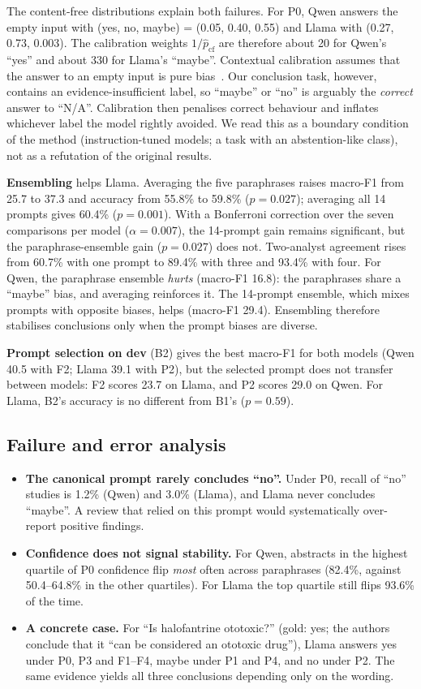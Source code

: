 The content-free distributions explain both failures. For P0, Qwen answers the empty input with (yes, no, maybe) = (0.05, 0.40, 0.55) and Llama with (0.27, 0.73, 0.003). The calibration weights $1/\hat{p}_{\text{cf}}$ are therefore about 20 for Qwen's ``yes'' and about 330 for Llama's ``maybe''. Contextual calibration assumes that the answer to an empty input is pure bias~\cite{zhao2021calibrate}. Our conclusion task, however, contains an evidence-insufficient label, so ``maybe'' or ``no'' is arguably the \emph{correct} answer to ``N/A''. Calibration then penalises correct behaviour and inflates whichever label the model rightly avoided. We read this as a boundary condition of the method (instruction-tuned models; a task with an abstention-like class), not as a refutation of the original results.

\textbf{Ensembling} helps Llama. Averaging the five paraphrases raises macro-F1 from 25.7 to 37.3 and accuracy from 55.8\% to 59.8\% ($p=0.027$); averaging all 14 prompts gives 60.4\% ($p=0.001$). With a Bonferroni correction over the seven comparisons per model ($\alpha=0.007$), the 14-prompt gain remains significant, but the paraphrase-ensemble gain ($p=0.027$) does not. Two-analyst agreement rises from 60.7\% with one prompt to 89.4\% with three and 93.4\% with four. For Qwen, the paraphrase ensemble \emph{hurts} (macro-F1 16.8): the paraphrases share a ``maybe'' bias, and averaging reinforces it. The 14-prompt ensemble, which mixes prompts with opposite biases, helps (macro-F1 29.4). Ensembling therefore stabilises conclusions only when the prompt biases are diverse.

\textbf{Prompt selection on dev} (B2) gives the best macro-F1 for both models (Qwen 40.5 with F2; Llama 39.1 with P2), but the selected prompt does not transfer between models: F2 scores 23.7 on Llama, and P2 scores 29.0 on Qwen. For Llama, B2's accuracy is no different from B1's ($p=0.59$).

\subsection{Failure and error analysis}
\label{subsec:errors}
\begin{itemize}
  \item \textbf{The canonical prompt rarely concludes ``no''.} Under P0, recall of ``no'' studies is 1.2\% (Qwen) and 3.0\% (Llama), and Llama never concludes ``maybe''. A review that relied on this prompt would systematically over-report positive findings.
  \item \textbf{Confidence does not signal stability.} For Qwen, abstracts in the highest quartile of P0 confidence flip \emph{most} often across paraphrases (82.4\%, against 50.4--64.8\% in the other quartiles). For Llama the top quartile still flips 93.6\% of the time.
  \item \textbf{A concrete case.} For ``Is halofantrine ototoxic?'' (gold: yes; the authors conclude that it ``can be considered an ototoxic drug''), Llama answers yes under P0, P3 and F1--F4, maybe under P1 and P4, and no under P2. The same evidence yields all three conclusions depending only on the wording.
\end{itemize}

